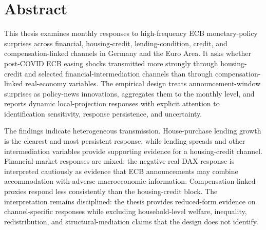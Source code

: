 \chapter*{Abstract}

This thesis examines monthly responses to high-frequency ECB monetary-policy surprises across financial, housing-credit, lending-condition, credit, and compensation-linked channels in Germany and the Euro Area. It asks whether post-COVID ECB easing shocks transmitted more strongly through housing-credit and selected financial-intermediation channels than through compensation-linked real-economy variables. The empirical design treats announcement-window surprises as policy-news innovations, aggregates them to the monthly level, and reports dynamic local-projection responses with explicit attention to identification sensitivity, response persistence, and uncertainty.

The findings indicate heterogeneous transmission. House-purchase lending growth is the clearest and most persistent response, while lending spreads and other intermediation variables provide supporting evidence for a housing-credit channel. Financial-market responses are mixed: the negative real DAX response is interpreted cautiously as evidence that ECB announcements may combine accommodation with adverse macroeconomic information. Compensation-linked proxies respond less consistently than the housing-credit block. The interpretation remains disciplined: the thesis provides reduced-form evidence on channel-specific responses while excluding household-level welfare, inequality, redistribution, and structural-mediation claims that the design does not identify.

\cleardoublepage
